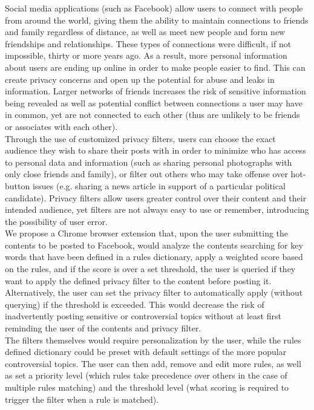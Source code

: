 \tab Social media applications (such as Facebook) allow users to connect with people from around the world, giving them the ability to maintain connections to friends and family regardless of distance, as well as meet new people and form new friendships and relationships. These types of connections were difficult, if not impossible, thirty or more years ago. As a result, more personal information about users are ending up online in order to make people easier to find. This can create privacy concerns and open up the potential for abuse and leaks in information. Larger networks of friends increases the risk of sensitive information being revealed as well as potential conflict between connections a user may have in common, yet are not connected to each other (thus are unlikely to be friends or associates with each other). 
\\
\tab Through the use of customized privacy filters, users can choose the exact audience they wish to share their posts with in order to minimize who has access to personal data and information (such as sharing personal photographs with only close friends and family), or filter out others who may take offense over hot-button issues (e.g. sharing a news article in support of a particular political candidate). Privacy filters allow users greater control over their content and their intended audience, yet filters are not always easy to use or remember, introducing the possibility of user error.\cite{naini2015}
\\
\tab We propose a Chrome browser extension that, upon the user submitting the contents to be posted to Facebook, would analyze the contents searching for key words that have been defined in a rules dictionary, apply a weighted score based on the rules, and if the score is over a set threshold, the user is queried if they want to apply the defined privacy filter to the content before posting it. Alternatively, the user can set the privacy filter to automatically apply (without querying) if the threshold is exceeded. This would decrease the risk of inadvertently posting sensitive or controversial topics without at least first reminding the user of the contents and privacy filter.
\\
\tab The filters themselves would require personalization by the user, while the rules defined dictionary could be preset with default settings of the more popular controversial topics. The user can then add, remove and edit more rules, as well as set a priority level (which rules take precedence over others in the case of multiple rules matching) and the threshold level (what scoring is required to trigger the filter when a rule is matched).